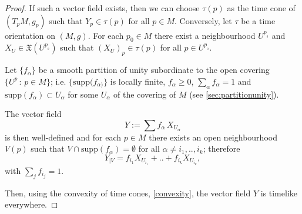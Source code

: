 \begin{proof}
    If such a vector field exists, then we can choose $\tau(p)$ as the time cone of $(T_pM,g_p)$ such that $Y_p\in \tau(p)$ for all $p\in M$. Conversely, let $\tau$ be a time orientation on $(M,g)$. For each $p_0 \in M$ there exist a neighbourhood $U^{p_{_0}}$ and $X_U\in \mathfrak{X}(U^{p_{_0}})$ such that $(X_U)_p \in \tau(p)$ for all $p\in U^{p_{_0}}$.

    Let $\{f_{\alpha}\}$ be a smooth partition of unity subordinate to the open covering $\{U^p\, : \, p\in M\}$; i.e. $\{\mathrm{supp}(f_{\alpha)}\}$ is locally finite, $f_{\alpha}\geq 0$, $\sum_{\alpha} f_{\alpha}=1$ and $\mathrm{supp}(f_{\alpha}) \subset U_{\alpha}$ for some $U_{\alpha}$ of the covering of $M$ (see \autoref{sec:partitionunity}).

    The vector field 
    \[
	    Y:=\sum f_{\alpha}\, X_{U_{\alpha}}
	\] 
	is then well-defined and for each $p\in M$ there exists an open neighbourhood $V(p)$ such that $V \cap \mathrm{supp}(f_{\alpha}) = \emptyset$ for all $\alpha \neq i_1,..,i_k$; therefore
    \[
        Y_{\mid V}=f_{i_1}X_{U_{i_1}}+..+f_{i_k}X_{U_{i_k}},
    \]
    with $\sum_j f_{i_j}=1$.

    Then, using the convexity of time cones, \autoref{convexity}, the vector field $Y$ is timelike everywhere.
\end{proof}

